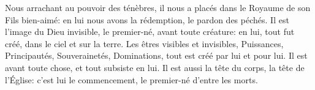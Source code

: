 Nous arrachant au pouvoir des ténèbres,
	il nous a placés dans le Royaume de son Fils bien-aimé:
	en lui nous avons la rédemption, le pardon des péchés.
Il est l’image du Dieu invisible, le premier-né, avant toute créature:
	en lui, tout fut créé, dans le ciel et sur la terre.
Les êtres visibles et invisibles, Puissances, Principautés,
	Souverainetés, Dominations, tout est créé par lui et pour lui.
Il est avant toute chose, et tout subsiste en lui.
Il est aussi la tête du corps, la tête de l’Église:
	c’est lui le commencement, le premier-né d’entre les morts.
